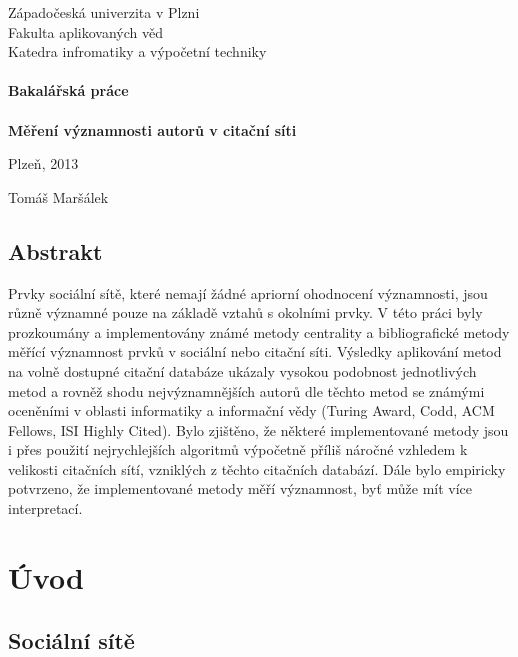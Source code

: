 \documentclass[12pt,titlepage]{report}
\begin{document}
\begin{titlepage}
\begin{center}
	\Large{Západočeská univerzita v Plzni} \\
	\Large{Fakulta aplikovaných věd} \\
	\Large{Katedra infromatiky a výpočetní techniky} \\
\mbox{} \\[1.6cm]
	\LARGE{{\bf Bakalářská práce}} \\
\mbox{} \\
	\Huge{{\bf Měření významnosti autorů v citační síti}} \\
\end{center}
\vfill
\begin{minipage}{.5\textwidth}
Plzeň, 2013
\end{minipage}
\begin{minipage}{.5\textwidth}
\hfill Tomáš Maršálek
\end{minipage}
\thispagestyle{empty}
\end{titlepage}

\section*{Abstrakt}
Prvky sociální sítě, které nemají žádné apriorní ohodnocení významnosti, jsou
různě významné pouze na základě vztahů s okolními prvky. V této práci byly
prozkoumány a implementovány známé metody centrality a bibliografické metody
měřící významnost prvků v sociální nebo citační síti. Výsledky aplikování metod
na volně dostupné citační databáze ukázaly vysokou podobnost jednotlivých metod
a rovněž shodu nejvýznamnějších autorů dle těchto metod se známými oceněními v
oblasti informatiky a informační vědy (Turing Award, Codd, ACM Fellows, ISI
Highly Cited). Bylo zjištěno, že některé implementované metody jsou i přes
použití nejrychlejších algoritmů výpočetně příliš náročné vzhledem k velikosti
citačních sítí, vzniklých z těchto citačních databází. Dále bylo empiricky
potvrzeno, že implementované metody měří významnost, byť může mít více
interpretací.

\tableofcontents

\chapter{Úvod}

\section{Sociální sítě}
\end{document}
